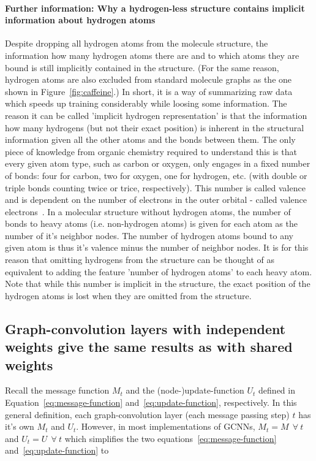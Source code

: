 \paragraph{Further information: Why a hydrogen-less structure contains implicit information about hydrogen atoms}
Despite dropping all hydrogen atoms from the molecule structure, the information how many hydrogen atoms there are and to which atoms they are bound is still implicitly contained in the structure. (For the same reason, hydrogen atoms are also excluded from standard molecule graphs as the one shown in Figure~\ref{fig:caffeine}.) In short, it is a way of summarizing raw data which speeds up training considerably while loosing some information. The reason it can be called 'implicit hydrogen representation' is that the information how many hydrogens (but not their exact position) is inherent in the structural information given all the other atoms and the bonds between them. The only piece of knowledge from organic chemistry required to understand this is that every given atom type, such as carbon or oxygen, only engages in a fixed number of bonds: four for carbon, two for oxygen, one for hydrogen, etc. (with double or triple bonds counting twice or trice, respectively). This number is called valence and is dependent on the number of electrons in the outer orbital - called valence electrons~\cite{Organic-chemistry}. In a molecular structure without hydrogen atoms, the number of bonds to heavy atoms (i.e. non-hydrogen atoms) is given for each atom as the number of it's neighbor nodes. The number of hydrogen atoms bound to any given atom is thus it's valence minus the number of neighbor nodes. It is for this reason that omitting hydrogens from the structure can be thought of as equivalent to adding the feature 'number of hydrogen atoms' to each heavy atom. Note that while this number is implicit in the structure, the exact position of the hydrogen atoms is lost when they are omitted from the structure.



\subsection{Graph-convolution layers with independent weights give the same results as with shared weights}
\label{sec:weight-sharing}

Recall the message function $M_t$ and the (node-)update-function $U_t$ defined in Equation~\ref{eq:message-function} and~\ref{eq:update-function}, respectively. In this general definition, each graph-convolution layer (each message passing step) $t$ has it's own $M_t$ and $U_t$. However, in most implementations of GCNNs, $M_t = M~~\forall~t$ and $U_t = U~~\forall~t$ which simplifies the two equations~\ref{eq:message-function} and~\ref{eq:update-function} to

